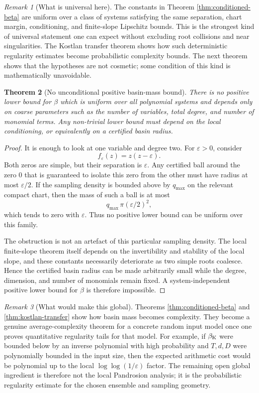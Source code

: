 \documentclass[11pt]{article}
\newtheorem{theorem}{Theorem}[section]
\theoremstyle{definition}
\theoremstyle{remark}
\newtheorem{remark}[theorem]{Remark}
\begin{document}
\begin{remark}[What is universal here]
The constants in Theorem \ref{thm:conditioned-beta} are uniform over a class of systems satisfying the same separation, chart margin, conditioning, and finite-slope Lipschitz bounds.  This is the strongest kind of universal statement one can expect without excluding root collisions and near singularities.  The Kostlan transfer theorem shows how such deterministic regularity estimates become probabilistic complexity bounds.  The next theorem shows that the hypotheses are not cosmetic; some condition of this kind is mathematically unavoidable.
\end{remark}

\begin{theorem}[No unconditional positive basin-mass bound]\label{thm:no-universal-beta}
There is no positive lower bound for $\beta$ which is uniform over all polynomial systems and depends only on coarse parameters such as the number of variables, total degree, and number of monomial terms.  Any non-trivial lower bound must depend on the local conditioning, or equivalently on a certified basin radius.
\end{theorem}

\begin{proof}
It is enough to look at one variable and degree two.  For $\varepsilon>0$, consider
\[
        f_\varepsilon(z)=z(z-\varepsilon).
\]
Both zeros are simple, but their separation is $\varepsilon$.  Any certified ball around the zero $0$ that is guaranteed to isolate this zero from the other must have radius at most $\varepsilon/2$.  If the sampling density is bounded above by $q_{\max}$ on the relevant compact chart, then the mass of such a ball is at most
\[
        q_{\max}\,\pi(\varepsilon/2)^2,
\]
which tends to zero with $\varepsilon$.  Thus no positive lower bound can be uniform over this family.

The obstruction is not an artefact of this particular sampling density.  The local finite-slope theorem itself depends on the invertibility and stability of the local slope, and these constants necessarily deteriorate as two simple roots coalesce.  Hence the certified basin radius can be made arbitrarily small while the degree, dimension, and number of monomials remain fixed.  A system-independent positive lower bound for $\beta$ is therefore impossible.
\end{proof}

\begin{remark}[What would make this global]
Theorems \ref{thm:conditioned-beta} and \ref{thm:kostlan-transfer} show how basin mass becomes complexity.  They become a genuine average-complexity theorem for a concrete random input model once one proves quantitative regularity tails for that model.  For example, if $\beta_{\rm K}$ were bounded below by an inverse polynomial with high probability and $T,d,D$ were polynomially bounded in the input size, then the expected arithmetic cost would be polynomial up to the local $\log\log(1/\varepsilon)$ factor.  The remaining open global ingredient is therefore not the local Pandrosion analysis; it is the probabilistic regularity estimate for the chosen ensemble and sampling geometry.
\end{remark}
\end{document}
